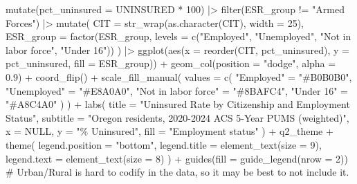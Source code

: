 \documentclass[
  letterpaper,
  DIV=11,
  numbers=noendperiod]{scrartcl}
\newenvironment{Shaded}{\begin{snugshade}}{\end{snugshade}}
\newcommand{\AttributeTok}[1]{\textcolor[rgb]{0.40,0.45,0.13}{#1}}
\newcommand{\CommentTok}[1]{\textcolor[rgb]{0.37,0.37,0.37}{#1}}
\newcommand{\ConstantTok}[1]{\textcolor[rgb]{0.56,0.35,0.01}{#1}}
\newcommand{\DecValTok}[1]{\textcolor[rgb]{0.68,0.00,0.00}{#1}}
\newcommand{\FloatTok}[1]{\textcolor[rgb]{0.68,0.00,0.00}{#1}}
\newcommand{\FunctionTok}[1]{\textcolor[rgb]{0.28,0.35,0.67}{#1}}
\newcommand{\NormalTok}[1]{\textcolor[rgb]{0.00,0.23,0.31}{#1}}
\newcommand{\OtherTok}[1]{\textcolor[rgb]{0.00,0.23,0.31}{#1}}
\newcommand{\SpecialCharTok}[1]{\textcolor[rgb]{0.37,0.37,0.37}{#1}}
\newcommand{\StringTok}[1]{\textcolor[rgb]{0.13,0.47,0.30}{#1}}
\begin{document}
\begin{Shaded}
\begin{Highlighting}[]
  \FunctionTok{mutate}\NormalTok{(}\AttributeTok{pct\_uninsured =}\NormalTok{ UNINSURED }\SpecialCharTok{*} \DecValTok{100}\NormalTok{) }\SpecialCharTok{|\textgreater{}}
  \FunctionTok{filter}\NormalTok{(ESR\_group }\SpecialCharTok{!=} \StringTok{"Armed Forces"}\NormalTok{) }\SpecialCharTok{|\textgreater{}}
  \FunctionTok{mutate}\NormalTok{(}
    \AttributeTok{CIT       =} \FunctionTok{str\_wrap}\NormalTok{(}\FunctionTok{as.character}\NormalTok{(CIT), }\AttributeTok{width =} \DecValTok{25}\NormalTok{),}
    \AttributeTok{ESR\_group =} \FunctionTok{factor}\NormalTok{(ESR\_group,}
                       \AttributeTok{levels =} \FunctionTok{c}\NormalTok{(}\StringTok{"Employed"}\NormalTok{, }\StringTok{"Unemployed"}\NormalTok{,}
                                  \StringTok{"Not in labor force"}\NormalTok{, }\StringTok{"Under 16"}\NormalTok{))}
\NormalTok{  ) }\SpecialCharTok{|\textgreater{}}
  \FunctionTok{ggplot}\NormalTok{(}\FunctionTok{aes}\NormalTok{(}\AttributeTok{x =} \FunctionTok{reorder}\NormalTok{(CIT, pct\_uninsured),}
             \AttributeTok{y =}\NormalTok{ pct\_uninsured, }\AttributeTok{fill =}\NormalTok{ ESR\_group)) }\SpecialCharTok{+}
  \FunctionTok{geom\_col}\NormalTok{(}\AttributeTok{position =} \StringTok{"dodge"}\NormalTok{, }\AttributeTok{alpha =} \FloatTok{0.9}\NormalTok{) }\SpecialCharTok{+}
  \FunctionTok{coord\_flip}\NormalTok{() }\SpecialCharTok{+}
  \FunctionTok{scale\_fill\_manual}\NormalTok{(}
    \AttributeTok{values =} \FunctionTok{c}\NormalTok{(}
      \StringTok{"Employed"}           \OtherTok{=} \StringTok{"\#B0B0B0"}\NormalTok{,}
      \StringTok{"Unemployed"}         \OtherTok{=} \StringTok{"\#E8A0A0"}\NormalTok{,}
      \StringTok{"Not in labor force"} \OtherTok{=} \StringTok{"\#8BAFC4"}\NormalTok{,}
      \StringTok{"Under 16"}           \OtherTok{=} \StringTok{"\#A8C4A0"}
\NormalTok{    )}
\NormalTok{  ) }\SpecialCharTok{+}
  \FunctionTok{labs}\NormalTok{(}
    \AttributeTok{title    =} \StringTok{"Uninsured Rate by Citizenship and Employment Status"}\NormalTok{,}
    \AttributeTok{subtitle =} \StringTok{"Oregon residents, 2020{-}2024 ACS 5{-}Year PUMS (weighted)"}\NormalTok{,}
    \AttributeTok{x        =} \ConstantTok{NULL}\NormalTok{,}
    \AttributeTok{y        =} \StringTok{"\% Uninsured"}\NormalTok{,}
    \AttributeTok{fill     =} \StringTok{"Employment status"}
\NormalTok{  ) }\SpecialCharTok{+}
\NormalTok{  q2\_theme }\SpecialCharTok{+}
  \FunctionTok{theme}\NormalTok{(}
    \AttributeTok{legend.position =} \StringTok{"bottom"}\NormalTok{,}
    \AttributeTok{legend.title    =} \FunctionTok{element\_text}\NormalTok{(}\AttributeTok{size =} \DecValTok{9}\NormalTok{),}
    \AttributeTok{legend.text     =} \FunctionTok{element\_text}\NormalTok{(}\AttributeTok{size =} \DecValTok{8}\NormalTok{)}
\NormalTok{  ) }\SpecialCharTok{+}
  \FunctionTok{guides}\NormalTok{(}\AttributeTok{fill =} \FunctionTok{guide\_legend}\NormalTok{(}\AttributeTok{nrow =} \DecValTok{2}\NormalTok{))}
\CommentTok{\# Urban/Rural is hard to codify in the data, so it may be best to not include it.}



\end{Highlighting}
\end{Shaded}
\end{document}
